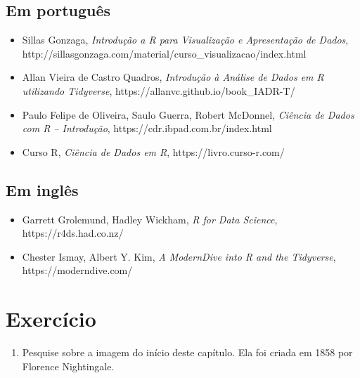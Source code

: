 \documentclass[
  letterpaper,
  DIV=11,
  numbers=noendperiod]{scrreprt}
\providecommand{\tightlist}{%
  \setlength{\itemsep}{0pt}\setlength{\parskip}{0pt}}\usepackage{longtable,booktabs,array}
\begin{document}
\subsection*{Em português}\label{em-portuguuxeas}

\begin{itemize}
\item
  Sillas Gonzaga, \emph{Introdução a R para Visualização e Apresentação
  de Dados},
  http://sillasgonzaga.com/material/curso\_visualizacao/index.html
\item
  Allan Vieira de Castro Quadros, \emph{Introdução à Análise de Dados em
  R utilizando Tidyverse}, https://allanvc.github.io/book\_IADR-T/
\item
  Paulo Felipe de Oliveira, Saulo Guerra, Robert McDonnel, \emph{Ciência
  de Dados com R -- Introdução}, https://cdr.ibpad.com.br/index.html
\item
  Curso R, \emph{Ciência de Dados em R}, https://livro.curso-r.com/
\end{itemize}

\subsection*{Em inglês}\label{em-ingluxeas}

\begin{itemize}
\item
  Garrett Grolemund, Hadley Wickham, \emph{R for Data Science},
  https://r4ds.had.co.nz/
\item
  Chester Ismay, Albert Y. Kim, \emph{A ModernDive into R and the
  Tidyverse}, https://moderndive.com/
\end{itemize}

\section*{Exercício}\label{exercuxedcio}


\begin{enumerate}
\def\labelenumi{\arabic{enumi}.}
\tightlist
\item
  Pesquise sobre a imagem do início deste capítulo. Ela foi criada em
  1858 por Florence Nightingale.
\end{enumerate}

\end{document}
